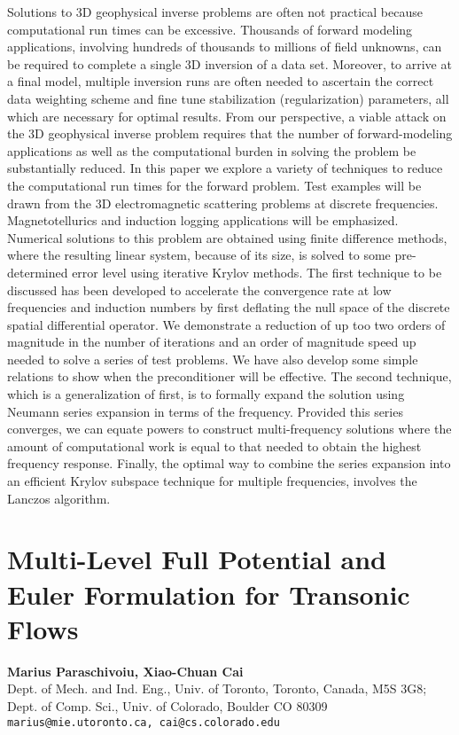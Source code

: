 \documentclass[11pt]{article}
\newcommand{\nextab}[4]{
	\section{#2}
	{\bf #1} \\ \nopagebreak
	{#3} \\ \nopagebreak
	{\tt #4} \nopagebreak
	}
\begin{document}
Solutions to 3D geophysical inverse problems are often not practical because
computational run times can be excessive. Thousands of forward modeling
applications, involving hundreds of thousands to millions of field unknowns,
can be required to complete a single 3D inversion of a data set. Moreover,
to arrive at a final model, multiple inversion runs are often needed to
ascertain the correct data weighting scheme and fine tune stabilization
(regularization) parameters, all which are necessary for optimal results.
From our perspective, a viable attack on the 3D geophysical inverse problem
requires that the number of forward-modeling applications as well as the
computational burden in solving the problem be substantially reduced. In
this paper we explore a variety of  techniques to reduce the computational
run times for the forward problem. Test examples will be drawn from the 3D
electromagnetic scattering problems at discrete frequencies.
Magnetotellurics and induction logging applications will be emphasized.
Numerical solutions to this problem are obtained using finite difference
methods, where the resulting linear system, because of its size, is solved
to some pre-determined error level using iterative Krylov methods. The first
technique to be discussed has been developed to accelerate the convergence
rate at low frequencies and induction numbers by first deflating the null
space of the discrete spatial differential operator. We demonstrate a
reduction of up too two orders of magnitude in the number of iterations and
an order of magnitude speed up needed to solve a series of test problems. We
have also develop some simple relations to show when the preconditioner will
be effective. The second technique, which is a generalization of first, is
to formally expand the solution using Neumann series expansion in terms of
the frequency. Provided this series converges, we can equate powers to
construct multi-frequency solutions where the amount of computational work
is equal to that needed to obtain the highest frequency response. Finally,
the optimal way to combine the series expansion into an efficient Krylov
subspace technique for multiple frequencies, involves the Lanczos algorithm.


\nextab{Marius Paraschivoiu, Xiao-Chuan Cai}
	{Multi-Level Full Potential and Euler Formulation
		for Transonic Flows}
	{Dept. of Mech. and Ind. Eng.,
	Univ. of Toronto, Toronto, Canada, M5S 3G8;
	Dept. of Comp. Sci., Univ. of Colorado, Boulder CO 80309}
	{marius@mie.utoronto.ca, cai@cs.colorado.edu}
\end{document}
